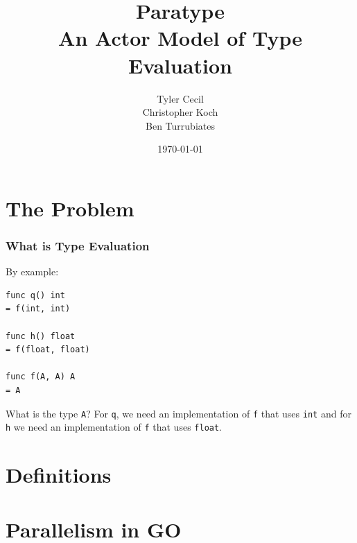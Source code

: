 \documentclass{beamer}
\begin{document}
\title[Paratype]{Paratype \\ An Actor Model of Type Evaluation}
\author[Cecil\\Koch\\Turrubiates]{Tyler Cecil \\ Christopher Koch \\ Ben Turrubiates}
\date{\today}

\frame{\titlepage}

\section{The Problem}


\begin{frame}[fragile]
  \frametitle{What is Type Evaluation}

  By example:
  \begin{lstlisting}[language=Paratype]
func q() int
= f(int, int)

func h() float
= f(float, float)

func f(A, A) A
= A
  \end{lstlisting}

  What is the type \texttt{A}? For \texttt{q}, we need an implementation of
  \texttt{f} that uses \texttt{int} and for \texttt{h} we need an
  implementation of \texttt{f} that uses \texttt{float}.
\end{frame}


\section{Definitions}


\section{Parallelism in GO}

\end{document}
